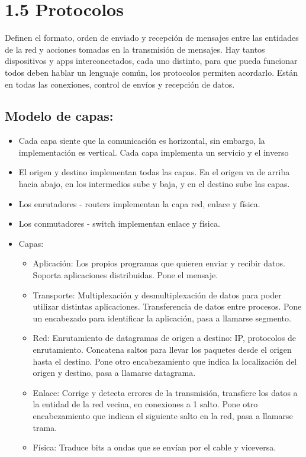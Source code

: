 \documentclass[12pt, twoside, openright]{report} %
\begin{document}
\section{1.5 Protocolos}

Definen el formato, orden de enviado y recepción de mensajes entre las
entidades de la red y acciones tomadas en la transmisión de mensajes.
Hay tantos dispositivos y apps interconectados, cada uno distinto, para
que pueda funcionar todos deben hablar un lenguaje común, los protocolos
permiten acordarlo. Están en todas las conexiones, control de envíos y
recepción de datos.

\subsection{Modelo de capas:}

\begin{itemize}
	\item Cada capa siente que la comunicación es horizontal, sin embargo, la
	      implementación es vertical. Cada capa implementa un servicio y el
	      inverso
	\item El origen y destino implementan todas las capas. En el origen va de
	      arriba hacia abajo, en los intermedios sube y baja, y en el destino
	      sube las capas.
	\item Los enrutadores - routers implementan la capa red, enlace y física.
	\item Los conmutadores - switch implementan enlace y física.
	\item Capas:

	      \begin{itemize}
		      \item Aplicación: Los propios programas que quieren enviar y recibir
		            datos. Soporta aplicaciones distribuidas. Pone el mensaje.
		      \item Transporte: Multiplexación y desmultiplexación de datos para poder
		            utilizar distintas aplicaciones. Transferencia de datos entre
		            procesos. Pone un encabezado para identificar la aplicación, pasa a
		            llamarse segmento.
		      \item Red: Enrutamiento de datagramas de origen a destino: IP, protocolos
		            de enrutamiento. Concatena saltos para llevar los paquetes desde el
		            origen hasta el destino. Pone otro encabezamiento que indica la
		            localización del origen y destino, pasa a llamarse datagrama.
		      \item Enlace: Corrige y detecta errores de la transmisión, transfiere los
		            datos a la entidad de la red vecina, en conexiones a 1 salto. Pone
		            otro encabezamiento que indican el siguiente salto en la red, pasa a
		            llamarse trama.
		      \item Física: Traduce bits a ondas que se envían por el cable y viceversa.
	      \end{itemize}

\end{itemize}
\end{document}
